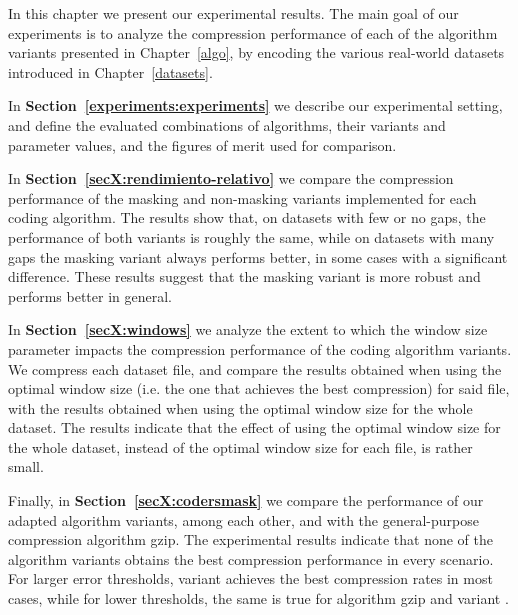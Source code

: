 
In this chapter we present our experimental results. The main goal of our experiments is to analyze the compression performance of each of the algorithm variants presented in Chapter~\ref{algo}, by encoding the various real-world datasets introduced in Chapter~\ref{datasets}. 

In \textbf{Section~\ref{experiments:experiments}} we describe our experimental setting, and define the evaluated combinations of algorithms, their variants and parameter values, and the figures of merit used for comparison. 

In \textbf{Section~\ref{secX:rendimiento-relativo}} we compare the compression performance of the masking and non-masking variants implemented for each coding algorithm. The results show that, on datasets with few or no gaps, the performance of both variants is roughly the same, while on datasets with many gaps the masking variant always performs better, in some cases with a significant difference. These results suggest that the masking variant is more robust and performs better in general. 

In \textbf{Section~\ref{secX:windows}} we analyze the extent to which the window size parameter impacts the compression performance of the coding algorithm variants. We compress each dataset file, and compare the results obtained when using the optimal window size (i.e. the one that achieves the best compression) for said file, with the results obtained when using the optimal window size for the whole dataset. The results indicate that the effect of using the optimal window size for the whole dataset, instead of the optimal window size for each file, is rather small. 

Finally, in \textbf{Section~\ref{secX:codersmask}} we compare the performance of our adapted algorithm variants, among each other, and with the general-purpose compression algorithm gzip. The experimental results indicate that none of the algorithm variants obtains the best compression performance in every scenario. For larger error thresholds, variant  achieves the best compression rates in most cases, while for lower thresholds, the same is true for algorithm gzip and variant .

